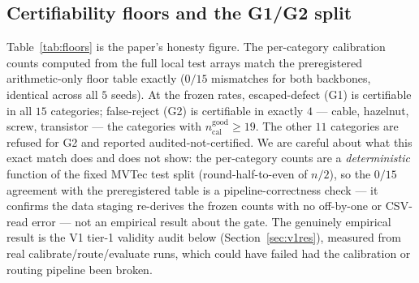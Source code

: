 \documentclass[11pt]{article}
\begin{document}
\subsection{Certifiability floors and the G1/G2 split}
\label{sec:floors}

Table~\ref{tab:floors} is the paper's honesty figure. The per-category calibration counts computed
from the full local test arrays match the preregistered arithmetic-only floor table exactly
($0/15$ mismatches for both backbones, identical across all $5$ seeds). At the frozen rates,
escaped-defect (G1) is certifiable in all $15$ categories; false-reject (G2) is certifiable
in exactly $4$ --- cable, hazelnut, screw, transistor --- the categories with
$n_{\text{cal}}^{\text{good}} \ge 19$. The other $11$ categories are refused for G2 and reported
audited-not-certified. We are careful about what this exact match does and does not show: the
per-category counts are a \emph{deterministic} function of the fixed MVTec test split
(round-half-to-even of $n/2$), so the $0/15$ agreement with the preregistered table is a
pipeline-correctness check --- it confirms the data staging re-derives the frozen counts with no
off-by-one or CSV-read error --- not an empirical result about the gate. The genuinely empirical
result is the V1 tier-1 validity audit below (Section~\ref{sec:v1res}), measured from real
calibrate/route/evaluate runs, which could have failed had the calibration or routing pipeline been
broken.
\end{document}
